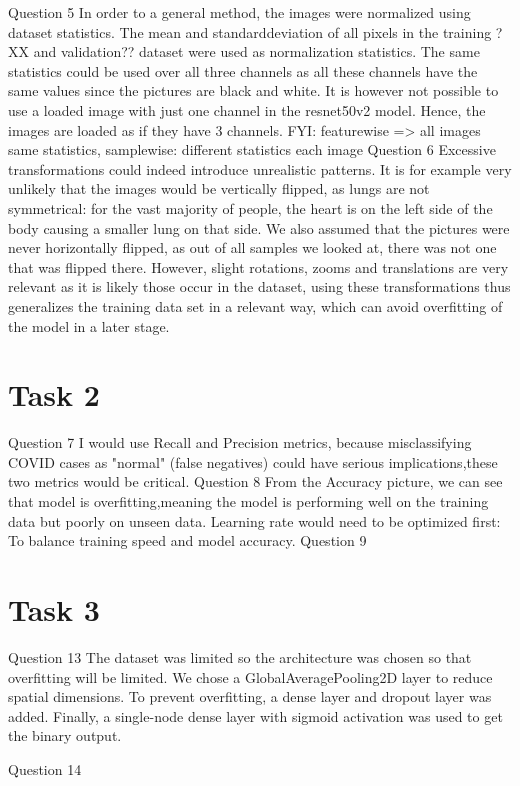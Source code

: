 \documentclass[conference]{IEEEtran}
\begin{document}
Question 5
In order to a general method, the images were normalized using dataset statistics. The mean and standarddeviation of all pixels in the training ?XX and validation?? dataset were used as normalization statistics. 
The same statistics could be used over all three channels as all these channels have the same values since the pictures are black and white. It is however not possible to use a loaded image with just one channel in the resnet50v2 model. Hence, the images are loaded as if they have 3 channels.
FYI: featurewise => all images same statistics, samplewise: different statistics each image
Question 6
Excessive transformations could indeed introduce unrealistic patterns. It is for example very unlikely that the images would be vertically flipped, as lungs are not symmetrical: for the vast majority of people, the heart is on the left side of the body causing a smaller lung on that side. 
We also assumed that the pictures were never horizontally flipped, as out of all samples we looked at, there was not one that was flipped there. However, slight rotations, zooms and translations are very relevant as it is likely those occur in the dataset, using these transformations thus generalizes the training data set in a relevant way, which can avoid overfitting of the model in a later stage.

\section{Task 2}
Question 7
I would use Recall and Precision metrics, because misclassifying COVID cases as "normal" (false negatives) could have serious implications,these two metrics would be critical.
Question 8
From the Accuracy picture, we can see that model is overfitting,meaning the model is performing well on the training data but poorly on unseen data. Learning rate would need to be optimized first: To balance training speed and model accuracy.
Question 9


\section{Task 3}
Question 13
The dataset was limited so the architecture was chosen so that overfitting will be limited. We chose a GlobalAveragePooling2D layer to reduce spatial dimensions.
To prevent overfitting, a dense layer and dropout layer was added. Finally, a single-node dense layer with sigmoid activation was used to get the binary output.

Question 14
\end{document}
